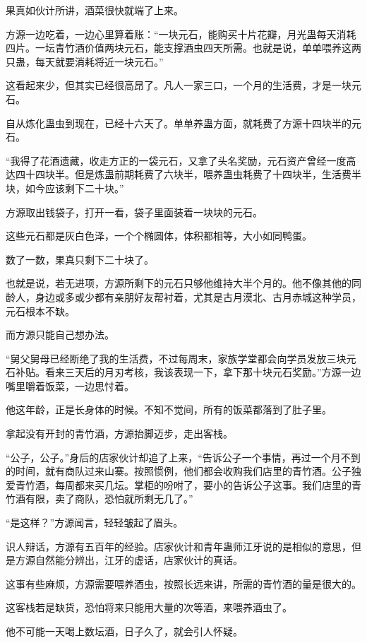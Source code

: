 \begin{this_body}
果真如伙计所讲，酒菜很快就端了上来。

方源一边吃着，一边心里算着账：“一块元石，能购买十片花瓣，月光蛊每天消耗四片。一坛青竹酒价值两块元石，能支撑酒虫四天所需。也就是说，单单喂养这两只蛊，每天就要消耗将近一块元石。”

这看起来少，但其实已经很高昂了。凡人一家三口，一个月的生活费，才是一块元石。

自从炼化蛊虫到现在，已经十六天了。单单养蛊方面，就耗费了方源十四块半的元石。

“我得了花酒遗藏，收走方正的一袋元石，又拿了头名奖励，元石资产曾经一度高达四十四块半。但是炼蛊前期耗费了六块半，喂养蛊虫耗费了十四块半，生活费半块，如今应该剩下二十块。”

方源取出钱袋子，打开一看，袋子里面装着一块块的元石。

这些元石都是灰白色泽，一个个椭圆体，体积都相等，大小如同鸭蛋。

数了一数，果真只剩下二十块了。

也就是说，若无进项，方源所剩下的元石只够他维持大半个月的。他不像其他的同龄人，身边或多或少都有亲朋好友帮衬着，尤其是古月漠北、古月赤城这种学员，元石根本不缺。

而方源只能自己想办法。

“舅父舅母已经断绝了我的生活费，不过每周末，家族学堂都会向学员发放三块元石补贴。看来三天后的月刃考核，我该表现一下，拿下那十块元石奖励。”方源一边嘴里嚼着饭菜，一边思忖着。

他这年龄，正是长身体的时候。不知不觉间，所有的饭菜都落到了肚子里。

拿起没有开封的青竹酒，方源抬脚迈步，走出客栈。

“公子，公子。”身后的店家伙计却追了上来，“告诉公子一个事情，再过一个月不到的时间，就有商队过来山寨。按照惯例，他们都会收购我们店里的青竹酒。公子独爱青竹酒，每周都来买几坛。掌柜的吩咐了，要小的告诉公子这事。我们店里的青竹酒有限，卖了商队，恐怕就所剩无几了。”

“是这样？”方源闻言，轻轻皱起了眉头。

识人辩话，方源有五百年的经验。店家伙计和青年蛊师江牙说的是相似的意思，但是方源自然能分辨出，江牙的虚话，店家伙计的真话。

这事有些麻烦，方源需要喂养酒虫，按照长远来讲，所需的青竹酒的量是很大的。

这客栈若是缺货，恐怕将来只能用大量的次等酒，来喂养酒虫了。

他不可能一天喝上数坛酒，日子久了，就会引人怀疑。


\end{this_body}
